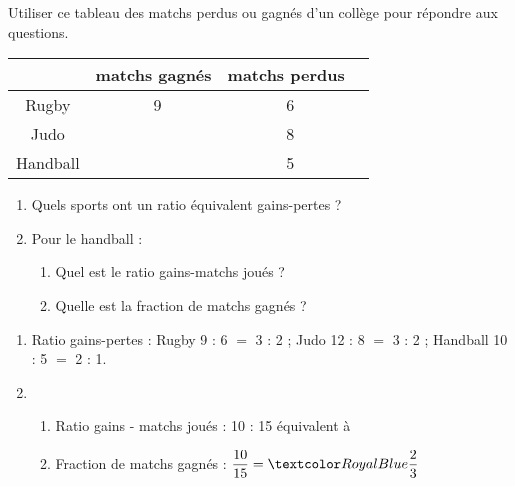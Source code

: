 \begin{Maquette}[Fiche,CorrigeFin,Colonnes=2]{}
\begin{multicols}{2}
      
      \begin{exercice} %
         Utiliser ce tableau des matchs perdus ou gagnés d'un collège pour répondre aux questions.
         \begin{center}
            {
            \begin{tabular}{|*4{C{1.8}|}}
               \hline
               & matchs gagnés & matchs perdus \\
               \hline
               Rugby & \quad\, 9 & \quad\, 6 \\
               \hline
               Judo &  & \quad\, 8 \\
               \hline
               Handball &  & \quad\, 5 \\
               \hline
            \end{tabular}}
         \end{center}
         \begin{enumerate}
            \item Quels sports ont un ratio équivalent gains-pertes ?
            \item Pour le handball :
            \begin{enumerate}
               \item Quel est le ratio gains-matchs joués ?
               \item Quelle est la fraction de matchs gagnés ?
            \end{enumerate}
         \end{enumerate}
      \end{exercice}
      
      \begin{Solution}
        \begin{enumerate}
            \item Ratio gains-pertes : Rugby 9 : 6 $=$ 3 : 2 ; Judo 12 : 8 $=$ 3 : 2 ; Handball 10 : 5 $=$ 2 : 1. 
            \item 
               \begin{enumerate}
                  \item Ratio gains - matchs joués : 10 : 15 équivalent à  \par
                  \item Fraction de matchs gagnés : $\dfrac{10}{15} =\cor{\dfrac23}$ \par
               \end{enumerate}
         \end{enumerate}
      \end{Solution}
      


\end{multicols}
\end{Maquette}
